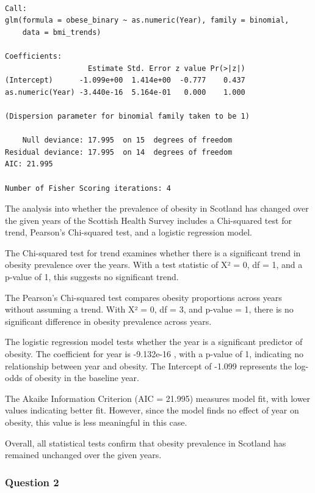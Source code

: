 \documentclass[
  letterpaper,
  DIV=11,
  numbers=noendperiod]{scrartcl}
\begin{document}
\begin{verbatim}

Call:
glm(formula = obese_binary ~ as.numeric(Year), family = binomial, 
    data = bmi_trends)

Coefficients:
                   Estimate Std. Error z value Pr(>|z|)
(Intercept)      -1.099e+00  1.414e+00  -0.777    0.437
as.numeric(Year) -3.440e-16  5.164e-01   0.000    1.000

(Dispersion parameter for binomial family taken to be 1)

    Null deviance: 17.995  on 15  degrees of freedom
Residual deviance: 17.995  on 14  degrees of freedom
AIC: 21.995

Number of Fisher Scoring iterations: 4
\end{verbatim}

The analysis into whether the prevalence of obesity in Scotland has
changed over the given years of the Scottish Health Survey includes a
Chi-squared test for trend, Pearson's Chi-squared test, and a logistic
regression model.

The Chi-squared test for trend examines whether there is a significant
trend in obesity prevalence over the years. With a test statistic of X²
= 0, df = 1, and a p-value of 1, this suggests no significant trend.

The Pearson's Chi-squared test compares obesity proportions across years
without assuming a trend. With X² = 0, df = 3, and p-value = 1, there is
no significant difference in obesity prevalence across years.

The logistic regression model tests whether the year is a significant
predictor of obesity. The coefficient for year is -9.132e-16 , with a
p-value of 1, indicating no relationship between year and obesity. The
Intercept of -1.099 represents the log-odds of obesity in the baseline
year.

The Akaike Information Criterion (AIC = 21.995) measures model fit, with
lower values indicating better fit. However, since the model finds no
effect of year on obesity, this value is less meaningful in this case.

Overall, all statistical tests confirm that obesity prevalence in
Scotland has remained unchanged over the given years.

\subsubsection{Question 2}\label{question-2}
\end{document}
